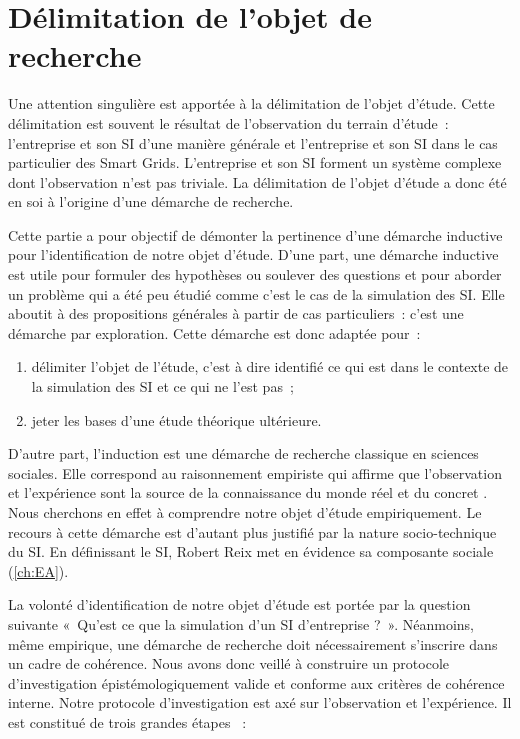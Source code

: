 	\section{Délimitation de l'objet de recherche}
		
	Une attention singulière est apportée à la délimitation de l'objet d'étude. 
Cette délimitation est souvent le résultat de l'observation du terrain d'étude~: 
l'entreprise et son SI d'une manière générale et l'entreprise et son SI dans le 
cas particulier des Smart Grids. L'entreprise et son SI forment un système 
complexe dont l'observation n'est pas triviale. La délimitation de l'objet 
d'étude a donc été en soi à l'origine d'une démarche de recherche.
	
	Cette partie a pour objectif de démonter la pertinence d'une démarche inductive 
pour l'identification de notre objet d'étude. D'une part, une démarche inductive 
est utile pour formuler des hypothèses ou soulever des questions et pour aborder 
un problème qui a été peu étudié comme c'est le cas de la simulation des SI. 
Elle aboutit à des propositions générales à partir de cas particuliers~: c'est 
une démarche par exploration. 
	Cette démarche est donc adaptée pour~: 
	\begin{enumerate}
	\item délimiter l'objet de l'étude, c'est à dire identifié ce qui est dans le 
contexte de la simulation des SI et ce qui ne l'est pas~;
	\item jeter les bases d'une étude théorique ultérieure.
	\end{enumerate}
	
	D'autre part, l'induction est une démarche de recherche classique en sciences 
sociales. Elle correspond au raisonnement empiriste qui affirme que 
l'observation et l'expérience sont la source de la connaissance du monde réel et 
du concret \cite{madeleine2001methodes}. Nous cherchons en effet à comprendre 
notre objet d'étude empiriquement. Le recours à cette démarche est d'autant plus 
justifié par la nature socio-technique du SI. En définissant le SI, Robert Reix 
met en évidence sa composante sociale (\ref{ch:EA}). 
	

	La volonté d'identification de notre objet d'étude est portée par la question 
suivante «~Qu'est ce que la simulation d'un SI d'entreprise ?~». Néanmoins, même 
empirique, une démarche de recherche doit nécessairement s'inscrire dans un 
cadre de cohérence. Nous avons donc veillé à construire un protocole 
d'investigation épistémologiquement valide et conforme aux critères de cohérence 
interne. Notre protocole d'investigation est axé sur l'observation et 
l'expérience. Il est constitué de trois grandes étapes ~:
		
